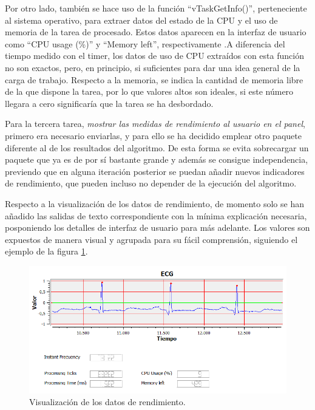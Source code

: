         
        Por otro lado,  también se hace uso de la función ``vTaskGetInfo()'', perteneciente al sistema operativo, para extraer datos del estado de la CPU y el uso de memoria de la tarea de procesado. Estos datos aparecen en la interfaz de usuario como ``CPU usage (\%)'' y ``Memory left'', respectivamente .A diferencia del tiempo medido con el timer, los datos de uso de CPU extraídos con esta función no son exactos, pero, en principio, si suficientes para dar una idea general de la carga de trabajo. Respecto a la memoria, se indica la cantidad de memoria libre de la que dispone la tarea, por lo que valores altos son ideales, si este número llegara a cero significaría que la tarea se ha desbordado. 
        
        Para la tercera tarea, \textit{mostrar las medidas de rendimiento al usuario en el panel}, primero era necesario enviarlas, y para ello se ha decidido emplear otro paquete diferente al de los resultados del algoritmo. De esta forma se evita sobrecargar un paquete que ya es de por sí bastante grande y además se consigue independencia, previendo que en alguna iteración posterior se puedan añadir nuevos indicadores de rendimiento, que pueden incluso no depender de la ejecución del algoritmo.
        
        Respecto a la visualización de los datos de rendimiento, de momento solo se han añadido las salidas de texto correspondiente con la mínima explicación necesaria, posponiendo los detalles de interfaz de usuario para más adelante. Los valores son expuestos de manera visual y agrupada para su fácil comprensión, siguiendo el ejemplo de la figura \ref{fig:performance}.
        
        \begin{figure}[H]
                \centering
                        \includegraphics[width = 0.9 \linewidth]{figuras/Performance.PNG}
                \caption{Visualización de los datos de rendimiento.}
                \label{fig:performance}
        \end{figure}
        
